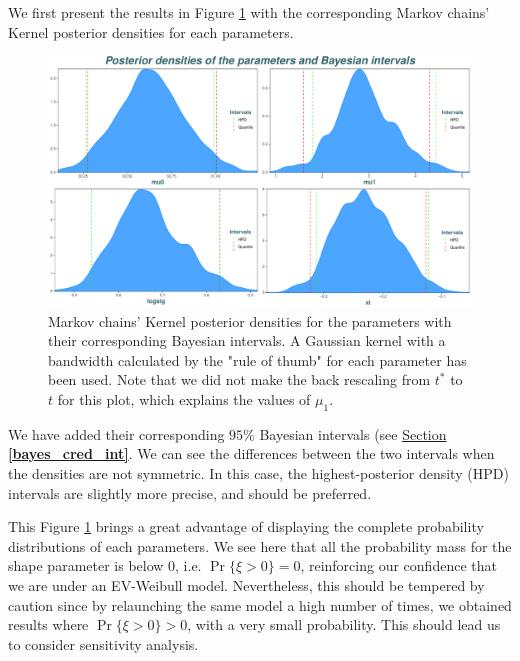 We first present the results in Figure \ref{fig:postdens} with the corresponding Markov chains' Kernel posterior densities for each parameters.
\begin{figure}[!htb]
	\centering	\includegraphics[width=0.8\linewidth]{postdens.pdf}\caption{Markov chains' Kernel posterior densities for the parameters with their corresponding Bayesian intervals. A Gaussian kernel with a bandwidth calculated by the \citet[pp.48, (3.31)]{silverman_1986} "rule of thumb" for each parameter has been used. Note that we did not make the back rescaling from $t^*$ to $t$ for this plot, which explains the values of $\mu_1$.}\label{fig:postdens}
\end{figure}
 We have added their corresponding $95\%$ Bayesian intervals (see \hyperref[bayes_cred_int]{Section \textbf{\ref{bayes_cred_int}}}. 
We can see the differences between the two intervals when the densities are not symmetric. In this case, the highest-posterior density (HPD) intervals are slightly more precise, and should be preferred.

This Figure \ref{fig:postdens} brings a great advantage of displaying the complete probability distributions of each parameters. We see here that all the probability mass for the shape parameter is below $0$, i.e. $\Pr \big\{\xi>0\big\}=0$, reinforcing our confidence that we are under an EV-Weibull model. %
Nevertheless, this should be tempered by caution since by relaunching the same model a high number of times, we obtained results where $\Pr \big\{\xi>0\big\}>0$, with a very small probability. This should lead us to consider sensitivity analysis.

